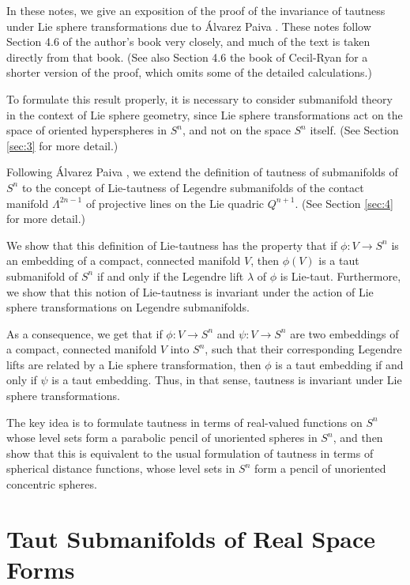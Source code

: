 \documentclass[12pt]{article}
\begin{document}
In these notes, we give an exposition of the proof of the invariance of tautness under Lie sphere transformations
due to \'{A}lvarez Paiva \cite{Alv}. These notes follow Section 4.6 of the author's book \cite[pp. 82-95]{Cec1} very closely, and much of the text is taken directly from that book. (See also Section 4.6 the book of 
Cecil-Ryan \cite[pp. 224--231]{CR8}
for a shorter version of the proof, which omits some of the detailed calculations.)



To formulate this result properly, it is necessary to consider submanifold theory in the context of Lie sphere geometry, since Lie sphere transformations act on the space of oriented hyperspheres in $S^n$, and not on the space $S^n$ itself.  
(See Section \ref{sec:3} for more detail.)




Following  \'{A}lvarez Paiva \cite{Alv}, we extend
the definition of tautness of submanifolds of $S^n$ to 
the concept of Lie-tautness of Legendre submanifolds of the contact manifold 
$\Lambda^{2n-1}$ of projective lines on the Lie quadric $Q^{n+1}$.
 (See Section \ref{sec:4} for more detail.)


We show that this definition of Lie-tautness has the property that if $\phi:V \rightarrow S^n$ is an embedding of a compact, connected manifold $V$, then $\phi(V)$ is a taut submanifold of $S^n$ if and only if the Legendre lift $\lambda$
of $\phi$ is Lie-taut. Furthermore, we show that
this notion of Lie-tautness is invariant under the action of Lie sphere transformations on Legendre submanifolds.  

As a consequence, we get that
if $\phi:V \rightarrow S^n$ and $\psi:V \rightarrow S^n$ are two embeddings of a compact, connected  
manifold $V$ into $S^n$, 
such that their corresponding Legendre lifts are related by a Lie sphere transformation,
then $\phi$ is a taut embedding if and only if $\psi$ is a taut embedding.  Thus, in that sense, tautness is invariant under Lie sphere transformations.

The key idea is to formulate tautness in terms of real-valued
functions on $S^n$ whose level sets form a parabolic pencil 
of unoriented spheres in $S^n$, and then show that this is equivalent to the usual formulation 
of tautness in terms of spherical distance functions, whose level sets in $S^n$ form a pencil of unoriented concentric spheres.  


 

\section{Taut Submanifolds of Real Space Forms}
\label{sec:1}
\end{document}
